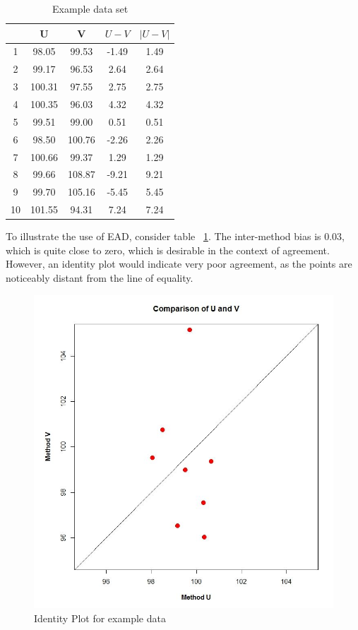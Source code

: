 \documentclass[12pt, a4paper]{report}
\theoremstyle{plain}
\theoremstyle{definition}
\theoremstyle{remark}
\begin{document}
\begin{table}[ht]
	\centering
	\begin{tabular}{|c|c|c|c|c|}
		\hline
		& U & V & $U-V$ & $|U-V|$ \\ 
		\hline
		1 & 98.05 & 99.53 & -1.49 & 1.49 \\ 
		2 & 99.17 & 96.53 & 2.64 & 2.64 \\ 
		3 & 100.31 & 97.55 & 2.75 & 2.75 \\ 
		4 & 100.35 & 96.03 & 4.32 & 4.32 \\ 
		5 & 99.51 & 99.00 & 0.51 & 0.51 \\ 
		6 & 98.50 & 100.76 & -2.26 & 2.26 \\ 
		7 & 100.66 & 99.37 & 1.29 & 1.29 \\ 
		8 & 99.66 & 108.87 & -9.21 & 9.21 \\ 
		9 & 99.70 & 105.16 & -5.45 & 5.45 \\ 
		10 & 101.55 & 94.31 & 7.24 & 7.24 \\ 
		\hline
	\end{tabular}
	\caption{Example data set}
	\label{EADdata}
\end{table}

To illustrate the use of EAD, consider table ~\ref{EADdata}. The inter-method bias is 0.03, which is quite close to zero, which is desirable in the context of agreement. However, an identity plot would indicate very poor agreement, as the points are noticeably distant from the line of equality.
\begin{figure}
	\centering
	\includegraphics[width=0.5\linewidth]{EAD-UV}
	\caption{Identity Plot for example data}
	\label{fig:EADidentity}
\end{figure}
\end{document}

